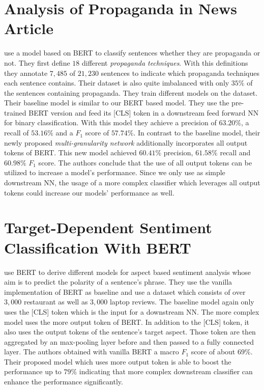 \section{Analysis of Propaganda in News Article}
\Textcite{Martino:2019} use a model based on \ac{BERT} to classify sentences whether they are propaganda or not.
They first define $18$ different \textit{propaganda techniques}.
With this definitions they annotate $7,485$ of $21,230$ sentences to indicate which propaganda techniques each sentence contains.
Their dataset is also quite imbalanced with only $35\%$ of the sentences containing propaganda.
They train different models on the dataset.
Their baseline model is similar to our \ac{BERT} based model.
They use the pre-trained \ac{BERT} version and feed its [CLS] token in a downstream feed forward \ac{NN} for binary classification.
With this model they achieve a precision of $63.20\%$, a recall of $53.16\%$ and a $F_1$ score of $57.74\%$.
In contrast to the baseline model, their newly proposed \textit{multi-granularity network} additionally incorporates all output tokens of \ac{BERT}.
This new model achieved $60.41\%$ precision, $61.58\%$ recall and $60.98\%$ $F_1$ score.
The authors conclude that the use of all output tokens can be utilized to increase a model's performance.
Since we only use as simple downstream \ac{NN}, the usage of a more complex classifier which leverages all output tokens could increase our models' performance as well.

\section[Target-Dependent Sentiment Classification With BERT]{Target-Dependent Sentiment Classification With \ac{BERT}}
\Textcite{Gao:2019} use \ac{BERT} to derive different models for aspect based sentiment analysis whose aim is to predict the polarity of a sentence's phrase.
They use the vanilla implementation of \ac{BERT} as baseline and use a dataset which consists of over $3,000$ restaurant as well as $3,000$ laptop reviews.
The baseline model again only uses the [CLS] token which is the input for a downstream \ac{NN}.
The more complex model uses the more output token of \ac{BERT}.
In addition to the [CLS] token, it also uses the output tokens of the sentence's target aspect.
Those token are then aggregated by an max-pooling layer before and then passed to a fully connected layer.
The authors obtained with vanilla \ac{BERT} a macro $F_1$ score of about $69\%$.
Their proposed model which uses more output token is able to boost the performance up to $79\%$ indicating that more complex downstream classifier can enhance the performance significantly.

